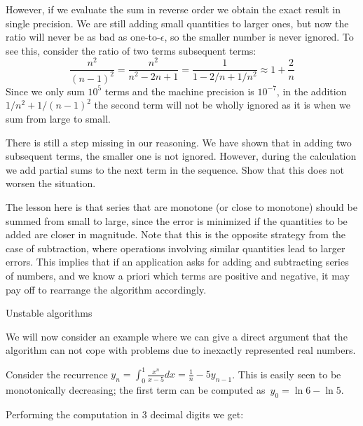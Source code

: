 However, if we evaluate the sum in reverse order
we obtain the exact result in single precision. We are still adding
small quantities to larger ones, but now the ratio will never be as
bad as one-to-$\epsilon$, so the smaller number is never ignored.
To see this,
consider the ratio of two terms subsequent terms:
\[ \frac{n^2}{(n-1)^2}=\frac{n^2}{n^2-2n+1}=\frac1{1-2/n+1/n^2}
    \approx 1+\frac2n
\]
Since we only sum $10^5$ terms and the machine precision is $10^{-7}$, 
in the addition $1/n^2+1/(n-1)^2$ the second term will not be wholly
ignored as it is when we sum from large to small.
\begin{exercise}
  There is still a step missing in our reasoning. We have shown that
  in adding two subsequent terms, the smaller one is not
  ignored. However, during the calculation we add partial sums to the
  next term in the sequence. Show that this does not worsen the situation.
\end{exercise}

The lesson here is that series that are monotone (or close to
monotone) should be summed from small to large, since the error is
minimized if the quantities to be added are closer in magnitude. Note
that this is the opposite strategy from the case of subtraction, where
operations involving similar quantities lead to larger errors. This
implies that if an application asks for adding and subtracting series
of numbers, and we know a priori which terms are positive and
negative, it may pay off to rearrange the algorithm accordingly.


 {Unstable algorithms}

We will now consider an example where we can give a direct argument
that the algorithm can not cope with problems due to inexactly
represented real numbers.

Consider the recurrence $y_n=\int_0^1 \frac{x^n}{x-5}dx =
\frac1n-5y_{n-1}$.%
This is easily seen to be monotonically decreasing; the first term can
be computed as~$y_0=\ln 6 - \ln 5$.

Performing the computation in 3 decimal digits we get:

